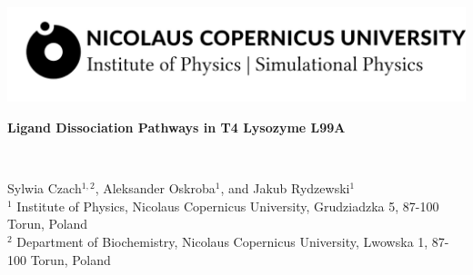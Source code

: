 \documentclass[a0,portrait]{a0poster}
\begin{document}
\begin{minipage}[b]{0.3\linewidth}
\centering
\includegraphics[width=25cm]{../fig/umk.png}
\end{minipage}\hspace*{4cm}

\vspace{1cm}

\begin{minipage}[b]{\linewidth}
\veryHuge\centering\color{myblue} 
\begin{minipage}[b]{\linewidth}
\textbf{Ligand Dissociation Pathways in T4 Lysozyme L99A}
  \end{minipage}
\end{minipage}
\color{Black}\\[1cm]
\begin{minipage}[b]{\linewidth}
  \huge Sylwia Czach$^{1,2}$, Aleksander Oskroba$^{1}$, and Jakub Rydzewski$^1$ \\[1cm]
\large $^1$ Institute of Physics, Nicolaus Copernicus University, Grudziadzka 5, 87-100 Torun, Poland\\
\large $^2$ Department of Biochemistry, Nicolaus Copernicus University, Lwowska 1, 87-100 Torun, Poland\\
\end{minipage}

\vspace{1cm}
\end{document}
